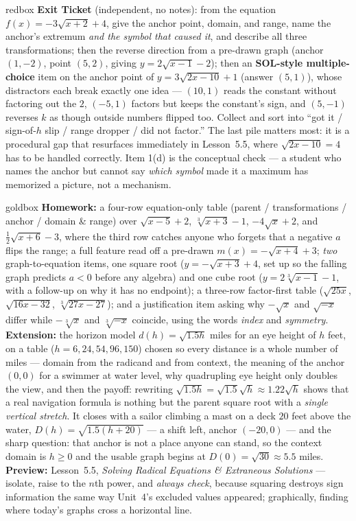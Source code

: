 \documentclass[10pt]{article}
\begin{document}
\begin{skillbox}{redbox}
\textbf{Exit Ticket} (independent, no notes): from the equation $f(x)=-3\sqrt{x+2}+4$, give the
anchor point, domain, and range, name the anchor's extremum \emph{and the symbol that caused it}, and
describe all three transformations; then the reverse direction from a pre-drawn graph (anchor
$(1,-2)$, point $(5,2)$, giving $y=2\sqrt{x-1}-2$); then an \textbf{SOL-style multiple-choice} item on
the anchor point of $y=3\sqrt{2x-10}+1$ (answer $(5,1)$), whose distractors each break exactly one
idea --- $(10,1)$ reads the constant without factoring out the $2$, $(-5,1)$ factors but keeps the
constant's sign, and $(5,-1)$ reverses $k$ as though outside numbers flipped too. Collect and sort
into ``got it / sign-of-$h$ slip / range dropper / did not factor.'' The last pile matters most: it is
a procedural gap that resurfaces immediately in Lesson~5.5, where $\sqrt{2x-10}=4$ has to be handled
correctly. Item 1(d) is the conceptual check --- a student who names the anchor but cannot say
\emph{which symbol} made it a maximum has memorized a picture, not a mechanism.
\end{skillbox}

\begin{skillbox}{goldbox}
\textbf{Homework:} a four-row equation-only table (parent / transformations / anchor / domain \& range)
over $\sqrt{x-5}+2$, $\sqrt[3]{x+3}-1$, $-4\sqrt{x}+2$, and $\frac12\sqrt{x+6}-3$, where the third row
catches anyone who forgets that a negative $a$ flips the range; a full feature read off a pre-drawn
$m(x)=-\sqrt{x+4}+3$; \emph{two} graph-to-equation items, one square root
($y=-\sqrt{x+3}+4$, set up so the falling graph predicts $a<0$ before any algebra) and one cube root
($y=2\sqrt[3]{x-1}-1$, with a follow-up on why it has no endpoint); a three-row factor-first table
($\sqrt{25x}$, $\sqrt{16x-32}$, $\sqrt[3]{27x-27}$); and a justification item asking why $-\sqrt{x}$
and $\sqrt{-x}$ differ while $-\sqrt[3]{x}$ and $\sqrt[3]{-x}$ coincide, using the words \emph{index}
and \emph{symmetry}. \textbf{Extension:} the horizon model $d(h)=\sqrt{1.5h}$ miles for an eye height
of $h$ feet, on a table ($h=6,24,54,96,150$) chosen so every distance is a whole number of miles ---
domain from the radicand and from context, the meaning of the anchor $(0,0)$ for a swimmer at water
level, why quadrupling eye height only doubles the view, and then the payoff: rewriting
$\sqrt{1.5h}=\sqrt{1.5}\sqrt{h}\approx1.22\sqrt{h}$ shows that a real navigation formula is nothing
but the parent square root with a \emph{single vertical stretch}. It closes with a sailor climbing a
mast on a deck $20$ feet above the water, $D(h)=\sqrt{1.5(h+20)}$ --- a shift left, anchor $(-20,0)$
--- and the sharp question: that anchor is not a place anyone can stand, so the context domain is
$h\ge0$ and the usable graph begins at $D(0)=\sqrt{30}\approx5.5$ miles. \textbf{Preview:}
Lesson~5.5, \emph{Solving Radical Equations \& Extraneous Solutions} --- isolate, raise to the $n$th
power, and \emph{always check}, because squaring destroys sign information the same way Unit~4's
excluded values appeared; graphically, finding where today's graphs cross a horizontal line.
\end{skillbox}
\end{document}
